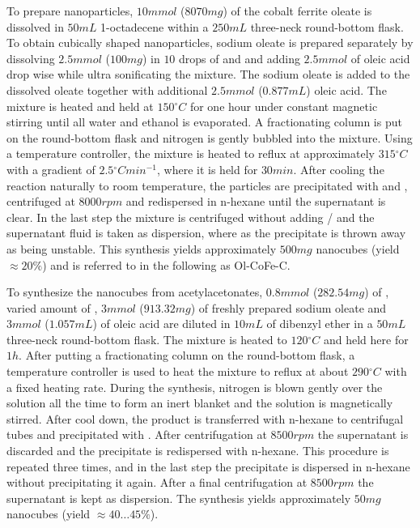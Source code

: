 \documentclass[\main/dresen_thesis.tex]{subfiles}
\begin{document}
    To prepare nanoparticles, $10 \unit{mmol}$ ($8070 \unit{mg}$) of the cobalt ferrite oleate is dissolved in $50 \unit{mL}$ 1-octadecene within a $250 \unit{mL}$ three-neck round-bottom flask.
    To obtain cubically shaped nanoparticles, sodium oleate is prepared separately by dissolving $2.5 \unit{mmol}$ ($100 \unit{mg}$)  in $10$ drops of  and  and adding $2.5 \unit{mmol}$ of oleic acid drop wise while ultra sonificating the mixture.
    The sodium oleate is added to the dissolved oleate together with additional $2.5 \unit{mmol}$ ($0.877 \unit{mL}$) oleic acid.
    The mixture is heated and held at $150 \unit{^\circ C}$ for one hour under constant magnetic stirring until all water and ethanol is evaporated.
    A fractionating column is put on the round-bottom flask and nitrogen is gently bubbled into the mixture.
    Using a temperature controller, the mixture is heated to reflux at approximately $315 \unit{^\circ C}$ with a gradient of $2.5 \unit{^\circ C min^{-1}}$, where it is held for $30 \unit{min}$.
    After cooling the reaction naturally to room temperature, the particles are precipitated with  and , centrifuged at $8000 \unit{rpm}$ and redispersed in n-hexane until the supernatant is clear.
    In the last step the mixture is centrifuged without adding / and the supernatant fluid is taken as dispersion, where as the precipitate is thrown away as being unstable.
    This synthesis yields approximately $500 \unit{mg}$ nanocubes (yield $\approx 20 \%$) and is referred to in the following as Ol-CoFe-C.


    To synthesize the nanocubes from acetylacetonates, $0.8 \unit{mmol}$ ($282.54 \unit{mg}$) of , varied amount of , $3 \unit{mmol}$ ($913.32 \unit{mg}$) of freshly prepared sodium oleate and $3 \unit{mmol}$ ($1.057 \unit{mL}$) of oleic acid are diluted in $10 \unit{mL}$ of dibenzyl ether in a $50 \unit{mL}$ three-neck round-bottom flask.
    The mixture is heated to $120 \unit{^\circ C}$ and held here for $1 \unit{h}$.
    After putting a fractionating column on the round-bottom flask, a temperature controller is used to heat the mixture to reflux at about $290 \unit{^\circ C}$ with a fixed heating rate.
    During the synthesis, nitrogen is blown gently over the solution all the time to form an inert blanket and the solution is magnetically stirred.
    After cool down, the product is transferred with n-hexane to centrifugal tubes and precipitated with .
    After centrifugation at $8500 \unit{rpm}$ the supernatant is discarded and the precipitate is redispersed with n-hexane.
    This procedure is repeated three times, and in the last step the precipitate is dispersed in n-hexane without precipitating it again.
    After a final centrifugation at $8500 \unit{rpm}$ the supernatant is kept as dispersion.
    The synthesis yields approximately $50 \unit{mg}$ nanocubes (yield $\approx 40 
    \ldots 45 \%$).
\end{document}
